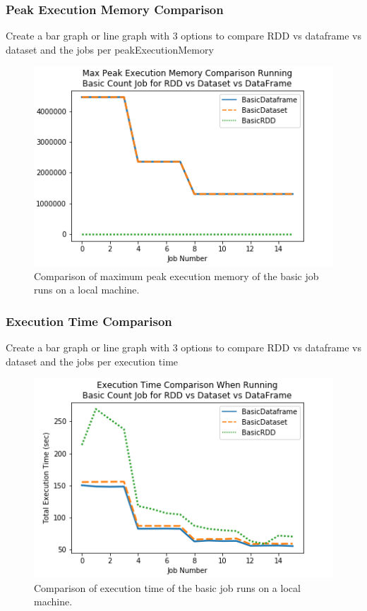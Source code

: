 \documentclass[conference]{IEEEtran}
\begin{document}
\subsubsection{Peak Execution Memory Comparison}
Create a bar graph or line graph with 3 options to compare RDD vs dataframe vs dataset and the jobs per peakExecutionMemory
\begin{figure}
    \includegraphics[width=\linewidth]{../python_scripts/images/basicJobMaxPeakExecutionMemory.png}
    \caption{Comparison of maximum peak execution memory of the basic job runs on a local machine.}
    \label{fig:basicJobMaxPeakExecutionMemory}
\end{figure}

\subsubsection{Execution Time Comparison}
Create a bar graph or line graph with 3 options to compare RDD vs dataframe vs dataset and the jobs per execution time
\begin{figure}
    \includegraphics[width=\linewidth]{../python_scripts/images/basicJobAllExecutionTime.png}
    \caption{Comparison of execution time of the basic job runs on a local machine.}
    \label{fig:basicJobAllExecutionTime}
\end{figure}
\end{document}
